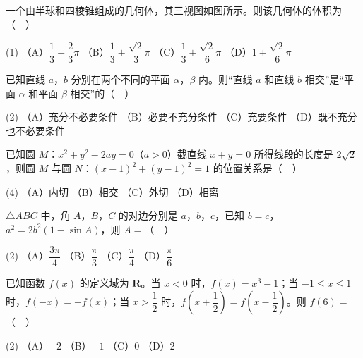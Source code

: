 \begin{question}
一个由半球和四棱锥组成的几何体，其三视图如图所示。则该几何体的体积为（　）
\nopagebreak[4]
\begin{center}\end{center}
\nopagebreak[4]
\begin{gkopts}(1)
\task （A）\(\dfrac{1}{3}+\dfrac{2}{3}\pi\)
\task （B）\(\dfrac{1}{3}+\dfrac{\sqrt{2}}{3}\pi\)
\task （C）\(\dfrac{1}{3}+\dfrac{\sqrt{2}}{6}\pi\)
\task （D）\(1+\dfrac{\sqrt{2}}{6}\pi\)
\end{gkopts}

\end{question}
\begin{question}
已知直线 \(a\)，\(b\) 分别在两个不同的平面 \(\alpha\)，\(\beta\) 内。则“直线 \(a\) 和直线 \(b\) 相交”是“平面 \(\alpha\) 和平面 \(\beta\) 相交”的（　）

\begin{gkopts}(2)
\task （A）充分不必要条件
\task （B）必要不充分条件
\task （C）充要条件
\task （D）既不充分也不必要条件
\end{gkopts}

\end{question}
\begin{question}
已知圆 \(M\)：\(x^2+y^2-2ay=0\)（\(a>0\)）截直线 \(x+y=0\) 所得线段的长度是 \(2\sqrt{2}\)，则圆 \(M\) 与圆 \(N\)：\((x-1)^2+(y-1)^2=1\) 的位置关系是（　）

\begin{gkopts}(4)
\task （A）内切
\task （B）相交
\task （C）外切
\task （D）相离
\end{gkopts}

\end{question}
\begin{question}
\(\triangle ABC\) 中，角 \(A\)，\(B\)，\(C\) 的对边分别是 \(a\)，\(b\)，\(c\)，已知 \(b=c\)，\(a^2=2b^2(1-\sin A)\)，则 \(A=\)（　）

\begin{gkopts}(2)
\task （A）\(\dfrac{3\pi}{4}\)
\task （B）\(\dfrac{\pi}{3}\)
\task （C）\(\dfrac{\pi}{4}\)
\task （D）\(\dfrac{\pi}{6}\)
\end{gkopts}

\end{question}
\begin{question}
已知函数 \(f(x)\) 的定义域为 \(\mathbf{R}\)。当 \(x<0\) 时，\(f(x)=x^3-1\)；当 \(-1\leqslant x\leqslant 1\) 时，\(f(-x)=-f(x)\)；当 \(x>\dfrac{1}{2}\) 时，\(f\left(x+\dfrac{1}{2}\right)=f\left(x-\dfrac{1}{2}\right)\)。则 \(f(6)=\)（　）

\begin{gkopts}(2)
\task （A）\(-2\)
\task （B）\(-1\)
\task （C）0
\task （D）2
\end{gkopts}

\end{question}
